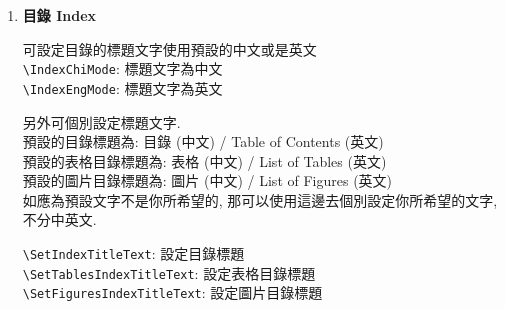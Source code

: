 \begin{enumerate}
{    而摘要中的關鍵字, 為了方便同學們能達到以下情況:\\
    a. 只寫中文版摘要\\
    b. 只寫英文版摘要\\
    c. 同時寫中英文版摘要\\
    故中英文版的關鍵字都是可個別設定.\\
    \verb|\SetAbstractChiKeywords|: 用來設定中文版摘要的關鍵字\\
    \verb|\SetAbstractEngKeywords|: 用來設定英文版摘要的關鍵字\\
    \verb|\SetAbstractExtKeywords|: 用來設定英文延伸摘要的關鍵字 (只有你要編寫英文延伸摘要才需要設定)\\
    所以只要使用你需要寫的版本則可. 但如果2個版本都要寫, 則2個都同時使用則可. 沒有填寫的話, 則摘要中的關鍵字部份是不會顯示出來.

    e.g\\
    \verb|\SetAbstractChiKeywords|{關鍵字 A}{關鍵字 B}{關鍵字 C}\\
    \verb|\SetAbstractEngKeywords|{Keyword A}{Keyword B}{Keyword C}\\
    \verb|\SetAbstractExtKeywords|{Keyword A}{Keyword B}{Keyword C}\\
    英文延伸摘要的關鍵字理應會跟英文版摘要的關鍵字是一樣, 但為了同學能編寫不同內容和關鍵字, 故可獨立設定.
  } %

  \item
  {
    \textbf{目錄 Index}

    可設定目錄的標題文字使用預設的中文或是英文\\
    \verb|\IndexChiMode|:  標題文字為中文\\
    \verb|\IndexEngMode|:  標題文字為英文

    另外可個別設定標題文字.\\
    預設的目錄標題為: 目錄 (中文) / Table of Contents (英文)\\
    預設的表格目錄標題為: 表格 (中文) / List of Tables (英文)\\
    預設的圖片目錄標題為: 圖片 (中文) / List of Figures (英文)\\
    如應為預設文字不是你所希望的, 那可以使用這邊去個別設定你所希望的文字, 不分中英文.

    \verb|\SetIndexTitleText|: 設定目錄標題\\
    \verb|\SetTablesIndexTitleText|: 設定表格目錄標題\\
    \verb|\SetFiguresIndexTitleText|: 設定圖片目錄標題
  } %


\end{enumerate}
